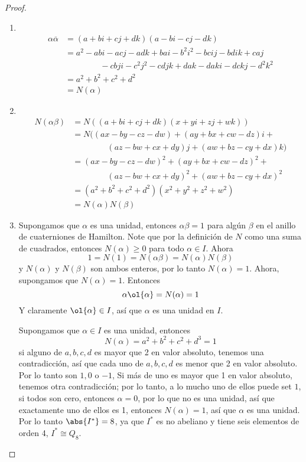 \begin{proof}
    \,
    \begin{enumerate}
        \item \, 
        \begin{align*}
            \alpha \overline{\alpha} &= (a+bi+cj+dk)(a-bi-cj-dk) \\
            &= a^2 - abi - acj - adk + bai - b^2i^2 - bcij - bdik + caj \\
            &\ \qquad \qquad - cbji - c^2j^2 - cdjk + dak - daki - dckj - d^2k^2 \\
            &= a^2+b^2+c^2+d^2 \\ 
            &= N(\alpha)
        \end{align*}
        \item \,
        \begin{align*}
            N(\alpha\beta) &= N((a+bi+cj+dk)(x+yi+zj+wk)) \\
            &= N((ax-by-cz-dw) +(ay+bx+cw-dz)i + \\
            &\ \qquad \qquad (az-bw + cx+dy)j +(aw+bz-cy+dx)k) \\
            &= (ax-by-cz-dw)^2 + (ay+bx+cw-dz)^2 + \\
            &\ \qquad \qquad (az-bw+cx+dy)^2  +(aw+bz-cy+dx)^2\\ 
            &= (a^2 + b^2 + c^2 + d^2)(x^2 + y^2 + z^2 + w^2)\\ 
            &= N(\alpha)N(\beta)
        \end{align*}
        
        \item Supongamos que $\alpha$ es una unidad, entonces $\alpha\beta = 1$ para algún $\beta$ en el anillo  de cuaterniones de Hamilton. Note que por la definición de $N$ como una suma de cuadrados, entonces $N(\alpha) \geq 0$ para todo $\alpha \in I$. Ahora
        $$ 1 = N(1) = N(\alpha\beta) = N(\alpha)N(\beta) $$
        y $N(\alpha)$ y $N(\beta)$ son ambos enteros, por lo tanto $N(\alpha) = 1$. Ahora, supongamos que $N(\alpha) = 1$. Entonces
        $$ \alpha \ol{\alpha} = N(\alpha) = 1$$
        Y claramente $\ol{\alpha} \in I$, así que $\alpha$ es una unidad en $I$.

        Supongamos que $\alpha \in I$ es una unidad, entonces
        $$ N(\alpha) = a^2 + b^2 + c^2 + d^3 = 1$$
        si alguno de $a, b, c, d$ es mayor que 2 en valor absoluto, tenemos una contradicción, así que cada uno de $a, b, c, d$ es menor que 2 en valor absoluto. Por lo tanto son $1, 0$ o  $-1$, Si más de uno es mayor que 1 en valor absoluto, tenemos otra contradicción; por lo tanto, a lo mucho uno de ellos puede set $1$, si todos son cero, entonces $\alpha = 0$, por lo que no es una unidad, así que exactamente uno de ellos es 1, entonces $N(\alpha) = 1$, así que $\alpha$ es una unidad. Por lo tanto $\abs{I^*} = 8$, ya que $I^*$ es no abeliano y tiene seis elementos de orden 4, $I^* \cong Q_8$.
    \end{enumerate}
\end{proof}